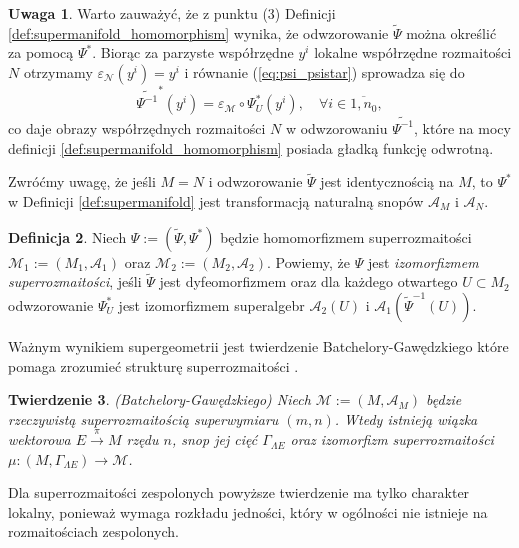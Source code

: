 \documentclass[11pt,a4paper]{report}
\newtheorem{theorem}{Twierdzenie}[section]
\theoremstyle{definition}
\newtheorem{definition}[theorem]{Definicja}
\newtheorem{remark}[theorem]{Uwaga}
\begin{document}
\begin{remark}
	Warto zauważyć, że z punktu (3) Definicji \ref{def:supermanifold_homomorphism} wynika, że odwzorowanie $\widetilde{\Psi}$ można określić za pomocą $\Psi^*$. Biorąc za parzyste współrzędne $y^i$ lokalne współrzędne rozmaitości $N$ otrzymamy $\varepsilon_\mathcal{N} (y^i) = y^i$ i równanie (\ref{eq:psi_psistar}) sprowadza się do
	\begin{equation*}
		\widetilde{\Psi^{-1}}^* (y^i) = \varepsilon_\mathcal{M} \circ \Psi_U ^* (y^i), \quad \forall i \in \overline{1, n_0},
	\end{equation*}
	co daje obrazy współrzędnych rozmaitości $N$ w odwzorowaniu $\widetilde{\Psi^{-1}}$, które na mocy definicji \ref{def:supermanifold_homomorphism} posiada gładką funkcję odwrotną.
\end{remark}
		      			
Zwróćmy uwagę, że jeśli $M = N$ i odwzorowanie $\widetilde{\Psi}$ jest identycznością na $M$, to $\Psi^*$ w Definicji \ref{def:supermanifold} jest transformacją naturalną snopów $\mathcal{A}_M$ i $\mathcal{A}_N$.
		      			
\begin{definition}
	\label{def:supermanifold_isomomorphism}
	Niech $\Psi := ( \widetilde{\Psi}, \Psi^* )$ będzie homomorfizmem superrozmaitości $\mathcal{M}_1 := (M_1, \mathcal{A}_1)$ oraz $\mathcal{M}_2 := (M_2, \mathcal{A}_2)$. Powiemy, że $\Psi$ jest \textit{izomorfizmem superrozmaitości}, jeśli $\widetilde{\Psi}$ jest dyfeomorfizmem oraz dla każdego otwartego $U \subset M_2$ odwzorowanie $\Psi^*_U$ jest izomorfizmem superalgebr $\mathcal{A}_2(U)$ i $\mathcal{A}_1(\widetilde{\Psi}^{-1}(U))$.
\end{definition}
		      			
Ważnym wynikiem supergeometrii jest twierdzenie Batchelory-Gawędzkiego które pomaga zrozumieć strukturę superrozmaitości \cite{batchelor}.
		      			
\begin{theorem}
	\label{thm:batchelor}
	(Batchelory-Gawędzkiego) Niech $\mathcal{M} := (M, \mathcal A _M)$ będzie rzeczywistą superrozmaitością superwymiaru $(m,n)$. Wtedy istnieją wiązka wektorowa $E \stackrel{\pi}{\rightarrow} M$ rzędu $n$, snop jej cięć $\Gamma_{\Lambda E}$ oraz izomorfizm superrozmaitości $\mu: (M, \Gamma_{\Lambda E}) \rightarrow \mathcal{M}$.
\end{theorem}
		      			
Dla superrozmaitości zespolonych powyższe twierdzenie ma tylko charakter lokalny, ponieważ wymaga rozkładu jedności, który w ogólności nie istnieje na rozmaitościach zespolonych.
		      			
\end{document}
